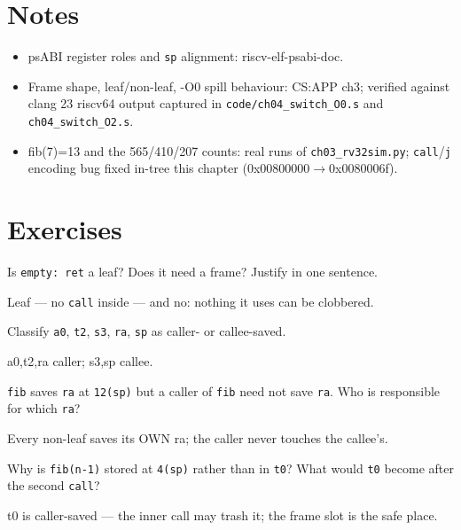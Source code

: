 \section*{Notes}
\label{sec:notes04}
\begin{itemize}
\item psABI register roles and \texttt{sp} alignment: riscv-elf-psabi-doc.
\item Frame shape, leaf/non-leaf, -O0 spill behaviour: CS:APP ch3;
      verified against clang 23 riscv64 output captured in
      \texttt{code/ch04\_switch\_O0.s} and \texttt{ch04\_switch\_O2.s}.
\item fib(7)=13 and the 565/410/207 counts: real runs of
      \texttt{ch03\_rv32sim.py}; \texttt{call}/\texttt{j} encoding bug
      fixed in-tree this chapter (0x00800000$\to$0x0080006f).
\end{itemize}

\section{Exercises}
\label{sec:exercises04}

\begin{exercise}[easy]\label{ex:e04a}
Is \texttt{empty: ret} a leaf? Does it need a frame? Justify in one
sentence.
\end{exercise}
\begin{solution}[hint]
Leaf --- no \texttt{call} inside --- and no: nothing it uses can be
clobbered.
\end{solution}

\begin{exercise}[easy]\label{ex:e04b}
Classify \texttt{a0}, \texttt{t2}, \texttt{s3}, \texttt{ra},
\texttt{sp} as caller- or callee-saved.
\end{exercise}
\begin{solution}[hint]
a0,t2,ra caller; s3,sp callee.
\end{solution}

\begin{exercise}[medium]\label{ex:m04a}
\texttt{fib} saves \texttt{ra} at \texttt{12(sp)} but a caller of
\texttt{fib} need not save \texttt{ra}. Who is responsible for which
\texttt{ra}?
\end{exercise}
\begin{solution}[hint]
Every non-leaf saves its OWN ra; the caller never touches the
callee's.
\end{solution}

\begin{exercise}[medium]\label{ex:m04b}
Why is \texttt{fib(n-1)} stored at \texttt{4(sp)} rather than in
\texttt{t0}? What would \texttt{t0} become after the second
\texttt{call}?
\end{exercise}
\begin{solution}[hint]
t0 is caller-saved --- the inner call may trash it; the frame slot
is the safe place.
\end{solution}

